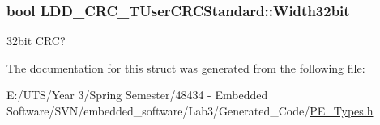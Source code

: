 \subsubsection[{Width32bit}]{\setlength{\rightskip}{0pt plus 5cm}bool L\+D\+D\+\_\+\+C\+R\+C\+\_\+\+T\+User\+C\+R\+C\+Standard\+::\+Width32bit}\label{struct_l_d_d___c_r_c___t_user_c_r_c_standard_a82a24fa9104800759f278afc36a4e00e}
32bit C\+R\+C? 

The documentation for this struct was generated from the following file\+:\begin{DoxyCompactItemize}
\item 
E\+:/\+U\+T\+S/\+Year 3/\+Spring Semester/48434 -\/ Embedded Software/\+S\+V\+N/embedded\+\_\+software/\+Lab3/\+Generated\+\_\+\+Code/\hyperlink{_p_e___types_8h}{P\+E\+\_\+\+Types.\+h}\end{DoxyCompactItemize}
